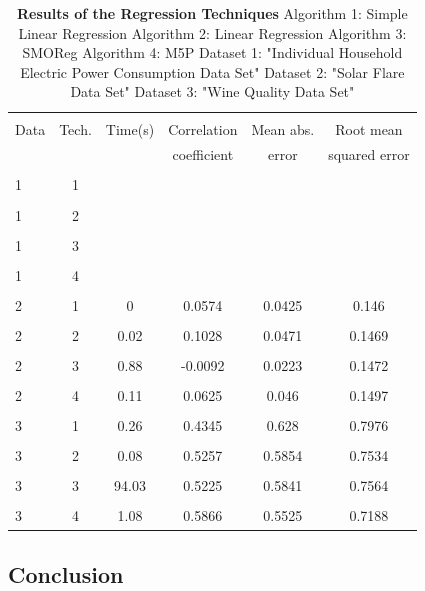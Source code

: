 \documentclass[a4paper]{article}
\begin{document}
\begin{table}
\begin{tabular}{|l| c | c |c |c |c |}

\hline & & & & & \\
Data & Tech. & Time(s) & Correlation & Mean abs.  & Root mean \\
 & & & coefficient & error & squared error  \\
\hline & & & & &  \\
1  & 1  &   &   &  &  \\ 
\hline & & & & & \\
1  & 2  &   &   &  &  \\ 
\hline & & & & & \\
1  & 3  &   &   &  &  \\ 
\hline & & & & & \\
1  & 4  &   &   &  &  \\ 
\hline & & & & & \\
2  & 1  & 0  & 0.0574  & 0.0425 & 0.146 \\ 
\hline & & & & & \\
2  & 2  & 0.02  &  0.1028 & 0.0471 & 0.1469  \\ 
\hline & & & & & \\
2  & 3  & 0.88  & -0.0092 & 0.0223 & 0.1472 \\ 
\hline & & & & & \\
2  & 4  & 0.11  & 0.0625  & 0.046   & 0.1497 \\ 
\hline & & & & & \\
3  & 1  & 0.26   & 0.4345  & 0.628   &  0.7976\\ 
\hline & & & & & \\
3  & 2  & 0.08  & 0.5257  & 0.5854 & 0.7534  \\ 
\hline & & & & & \\
3  & 3  & 94.03  &  0.5225  & 0.5841 & 0.7564 \\ 
\hline & & & & & \\
3  & 4  & 1.08  & 0.5866  & 0.5525  & 0.7188 \\ 
\hline
\end{tabular}
\caption{\textbf{Results of the Regression Techniques}
    Algorithm 1: Simple Linear Regression
    Algorithm 2: Linear Regression
    Algorithm 3: SMOReg
    Algorithm 4: M5P
    Dataset 1: "Individual Household Electric Power Consumption Data Set" 
    Dataset 2: "Solar Flare Data Set"
    Dataset 3: "Wine Quality Data Set"}
\end{table}


\subsection{Conclusion}
\end{document}
